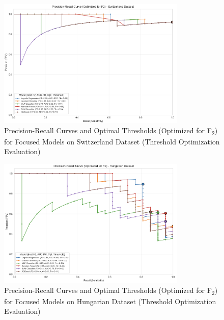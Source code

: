 \documentclass{article}
\begin{document}
\begin{figure}[htbp]
    \centering
    \includegraphics[width=0.8\textwidth]{plots/Switzerland_PR_Curve.png} %
    \caption{Precision-Recall Curves and Optimal Thresholds (Optimized for F\textsubscript{2}) for Focused Models on Switzerland Dataset (Threshold Optimization Evaluation)}
    \label{fig:pr_curve_switzerland}
\end{figure}

\begin{figure}[htbp]
    \centering
    \includegraphics[width=0.8\textwidth]{plots/Hungarian_PR_Curve.png} %
    \caption{Precision-Recall Curves and Optimal Thresholds (Optimized for F\textsubscript{2}) for Focused Models on Hungarian Dataset (Threshold Optimization Evaluation)}
    \label{fig:pr_curve_hungarian}
\end{figure}

\end{document}
